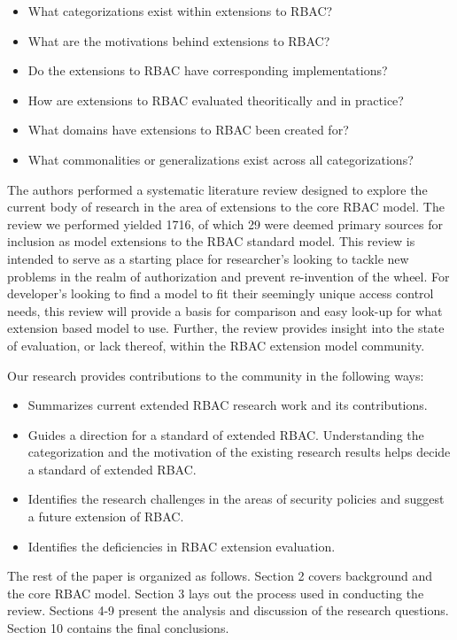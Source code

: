 \begin{itemize}
\setlength{\itemsep}{0.25pt}
\item What categorizations exist within extensions to RBAC?
\item What are the motivations behind extensions to RBAC?
\item Do the extensions to RBAC have corresponding implementations?
\item How are extensions to RBAC evaluated theoritically and in practice?
\item What domains have extensions to RBAC been created for?
\item What commonalities or generalizations exist across all categorizations?
\end{itemize}

The authors performed a systematic literature review designed to explore the current body of research in the area of extensions to the core RBAC model.  The review we performed yielded 1716, of which 29 were deemed primary sources for inclusion as model extensions to the RBAC standard model.  This review is intended to serve as a starting place for researcher's looking to tackle new problems in the realm of authorization and prevent re-invention of the wheel. For developer's looking to find a model to fit their seemingly unique access control needs, this review will provide a basis for comparison and easy look-up for what extension based model to use.  Further, the review provides insight into the state of evaluation, or lack thereof, within the RBAC extension model community.

Our research provides contributions to the community in the following ways:

\begin{itemize}
\setlength{\itemsep}{0.25pt}
\item Summarizes current extended RBAC research work and its contributions.
\item Guides a direction for a standard of extended RBAC. Understanding the categorization and the motivation of the existing research results helps decide a standard of extended RBAC.
\item Identifies the research challenges in the areas of security policies and suggest a future extension of RBAC.
\item Identifies the deficiencies in RBAC extension evaluation.
\end{itemize}

The rest of the paper is organized as follows.  Section 2 covers background and the core RBAC model. Section 3 lays out the process used in conducting the review. Sections 4-9 present the analysis and discussion of the research questions. Section 10 contains the final conclusions.
